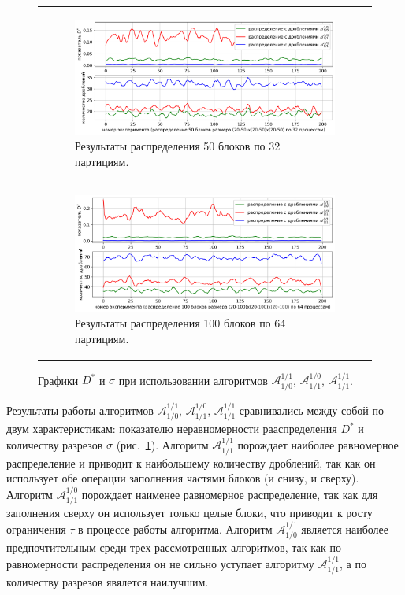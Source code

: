 \documentclass[a4paper,14pt]{extarticle}                     %
\theoremstyle{plain}                                         %
\begin{document}
\begin{figure}[ht]
\centering
\begin{tabular}{l}
\begin{subfigure}{1.0\textwidth}\centering\includegraphics[width=1.0\columnwidth]{fig/par_chart_distr_50_20_50_32.png}\caption{Результаты распределения 50 блоков по 32 партициям.}\end{subfigure} \\
\begin{subfigure}{1.0\textwidth}\centering\includegraphics[width=1.0\columnwidth]{fig/par_chart_distr_100_20_100_64.png}\caption{Результаты распределения 100 блоков по 64 партициям.}\end{subfigure}
\end{tabular}
\singlespacing
\caption{Графики $D^{*}$ и $\sigma$ при использовании алгоритмов $\mathscr{A}_{1/0}^{1/1}$, $\mathscr{A}_{1/1}^{1/0}$, $\mathscr{A}_{1/1}^{1/1}$.}
\label{fig:min_cuts_distr}
\end{figure}

Результаты работы алгоритмов $\mathscr{A}_{1/0}^{1/1}$, $\mathscr{A}_{1/1}^{1/0}$, $\mathscr{A}_{1/1}^{1/1}$ сравнивались между собой по двум характеристикам: показателю неравномерности рааспределения $D^{*}$ и количеству разрезов $\sigma$ (рис.~\ref{fig:min_cuts_distr}).
Алгоритм $\mathscr{A}_{1/1}^{1/1}$ порождает наиболее равномерное распределение и приводит к наибольшему количеству дроблений, так как он использует обе операции заполнения частями блоков (и снизу, и сверху).
Алгоритм $\mathscr{A}_{1/1}^{1/0}$ порождает наименее равномерное распределение, так как для заполнения сверху он использует только целые блоки, что приводит к росту ограничения $\tau$ в процессе работы алгоритма.
Алгоритм $\mathscr{A}_{1/0}^{1/1}$ является наиболее предпочтительным среди трех рассмотренных алгоритмов, так как по равномерности распределения он не сильно уступает алгоритму $\mathscr{A}_{1/1}^{1/1}$, а по количеству разрезов явялется наилучшим.
\end{document}
